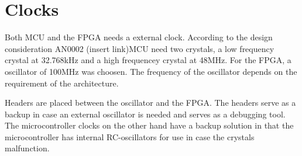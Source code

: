 \documentclass[../main/report.tex]{subfiles}
\begin{document}
\section{Clocks}
Both MCU and the FPGA needs a external clock.
According to the design consideration AN0002 (insert link)MCU need two crystals, a low frequency crystal at 32.768kHz and a high frequencey crystal at 48MHz. 
For the FPGA, a oscillator of 100MHz was choosen. The frequency of the oscillator depends on the requirement of the architecture.

Headers are placed between the oscillator and the FPGA. 
The headers serve as a backup in case an external oscillator is needed and serves as a debugging tool.
The microcontroller clocks on the other hand have a backup solution in that the microcontroller has internal RC-oscillators for use in case the crystals malfunction.
\end{document}
